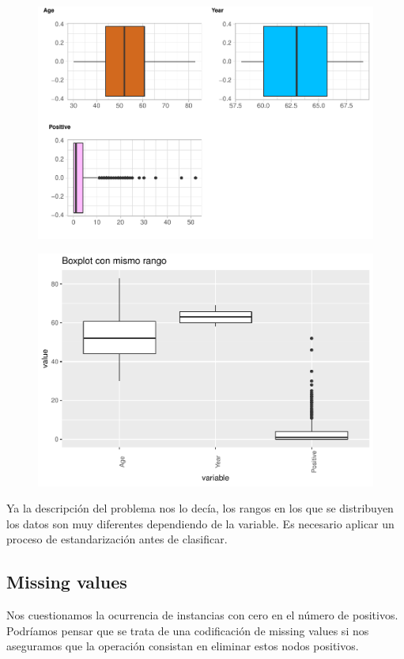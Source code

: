 \begin{figure}[H]\includegraphics[width=.9\linewidth]{img/EDA2_files/figure-latex/unnamed-chunk-11-4} \end{figure}

\begin{figure}[H]\includegraphics[width=.9\linewidth]{img/EDA2_files/figure-latex/unnamed-chunk-12-1} \end{figure}

Ya la descripción del problema nos lo decía, los rangos en los que se distribuyen los datos son muy diferentes dependiendo de la variable. Es necesario aplicar un proceso de estandarización antes de clasificar.

\subsection{Missing values}

Nos cuestionamos la ocurrencia de instancias con cero en el número de positivos. Podríamos pensar que se trata de una codificación de missing values si nos aseguramos que la operación consistan en eliminar estos nodos positivos.

